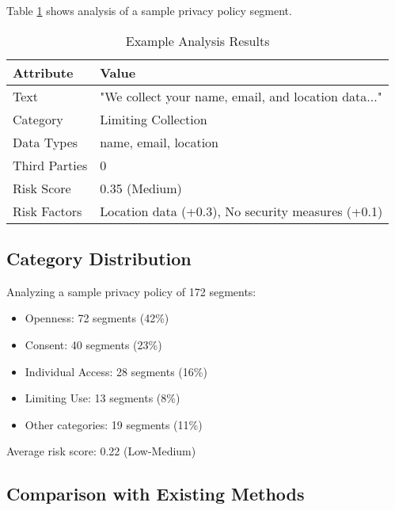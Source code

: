 \documentclass[conference]{IEEEtran}
\begin{document}
Table \ref{tab:example} shows analysis of a sample privacy policy segment.

\begin{table}[htbp]
\caption{Example Analysis Results}
\begin{center}
\begin{tabular}{|p{2.5cm}|p{4.5cm}|}
\hline
\textbf{Attribute} & \textbf{Value} \\
\hline
Text & "We collect your name, email, and location data..." \\
\hline
Category & Limiting Collection \\
\hline
Data Types & name, email, location \\
\hline
Third Parties & 0 \\
\hline
Risk Score & 0.35 (Medium) \\
\hline
Risk Factors & Location data (+0.3), No security measures (+0.1) \\
\hline
\end{tabular}
\label{tab:example}
\end{center}
\end{table}

\subsection{Category Distribution}

Analyzing a sample privacy policy of 172 segments:

\begin{itemize}
    \item Openness: 72 segments (42\%)
    \item Consent: 40 segments (23\%)
    \item Individual Access: 28 segments (16\%)
    \item Limiting Use: 13 segments (8\%)
    \item Other categories: 19 segments (11\%)
\end{itemize}

Average risk score: 0.22 (Low-Medium)

\subsection{Comparison with Existing Methods}
\end{document}
